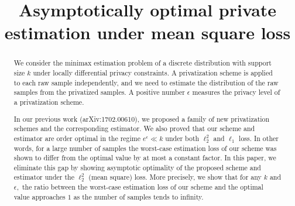 \documentclass[11pt,onecolumn]{IEEEtran}
\begin{document}

\title{Asymptotically optimal private estimation under mean square loss}


\author{ \hspace*{1in}
\and {}}


\maketitle
{\renewcommand{\thefootnote}{}
}
\renewcommand{\thefootnote}{\arabic{footnote}}
\setcounter{footnote}{0}

\begin{abstract}
We consider the minimax estimation problem of a discrete distribution with support size $k$ under locally differential privacy constraints. A privatization scheme is applied to each raw sample independently, and we need to estimate the distribution of the raw samples from the privatized samples. A positive number $\epsilon$ measures the privacy level of a privatization scheme. 

In our previous work (arXiv:1702.00610), we proposed a family of new privatization schemes and the corresponding estimator. We also 
proved that our scheme and estimator are order optimal in the regime $e^{\epsilon} \ll k$ under both $\ell_2^2$ and $\ell_1$ loss. 
In other words, for a large number of samples the worst-case estimation loss of our scheme was shown to differ from the optimal value by at most a constant factor. In this paper, we eliminate this gap by showing asymptotic optimality of the proposed scheme  and estimator 
under the $\ell_2^2$ (mean square) loss. More precisely, we show that for any $k$ and $\epsilon,$ the ratio between the worst-case estimation loss of our scheme and the optimal value approaches $1$ as the number of samples tends to infinity.
\end{abstract}

{\small\tableofcontents}


\vspace*{1in}
\end{document}
